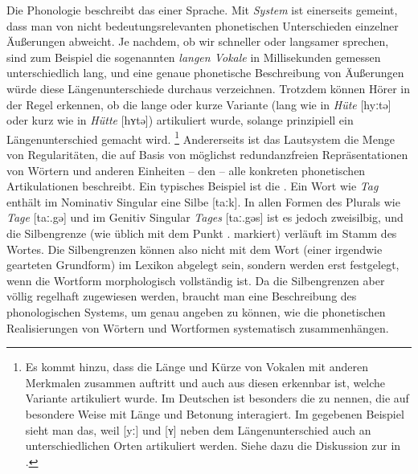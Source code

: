 Die Phonologie beschreibt das  einer Sprache.
Mit \textit{System} ist einerseits gemeint, dass man von nicht bedeutungsrelevanten phonetischen Unterschieden einzelner Äußerungen abweicht.
Je nachdem, ob wir schneller oder langsamer sprechen, sind zum Beispiel die sogenannten \textit{langen Vokale} in Millisekunden gemessen unterschiedlich lang, und eine genaue phonetische Beschreibung von Äußerungen würde diese Längenunterschiede durchaus verzeichnen.
Trotzdem können Hörer in der Regel erkennen, ob die lange oder kurze Variante (lang wie in \textit{Hüte} [hyːtə] oder kurz wie in \textit{Hütte} [hʏtə]) artikuliert wurde, solange prinzipiell ein Längenunterschied gemacht wird.%
\footnote{Es kommt hinzu, dass die Länge und Kürze von Vokalen mit anderen Merkmalen zusammen auftritt und auch aus diesen erkennbar ist, welche Variante artikuliert wurde.
Im Deutschen ist besonders die  zu nennen, die auf besondere Weise mit Länge und Betonung interagiert.
Im gegebenen Beispiel sieht man das, weil [yː] und [ʏ] neben dem Längenunterschied auch an unterschiedlichen Orten artikuliert werden.
Siehe dazu die Diskussion zur  in .}
Andererseits ist das Lautsystem die Menge von Regularitäten, die auf Basis von möglichst redundanzfreien Repräsentationen von Wörtern und anderen Einheiten -- den  -- alle konkreten phonetischen Artikulationen beschreibt.
Ein typisches Beispiel ist die .
Ein Wort wie \textit{Tag} enthält im Nominativ Singular eine Silbe [taːk].
In allen Formen des Plurals wie \textit{Tage} [taː.gə] und im Genitiv Singular \textit{Tages} [taː.gəs] ist es jedoch zweisilbig, und die Silbengrenze (wie üblich mit dem Punkt . markiert) verläuft im Stamm des Wortes.
Die Silbengrenzen können also nicht mit dem Wort (einer irgendwie gearteten Grundform) im Lexikon abgelegt sein, sondern werden erst festgelegt, wenn die Wortform morphologisch vollständig ist.
Da die Silbengrenzen aber völlig regelhaft zugewiesen werden, braucht man eine Beschreibung des phonologischen Systems, um genau angeben zu können, wie die phonetischen Realisierungen von Wörtern und Wortformen systematisch zusammenhängen.


